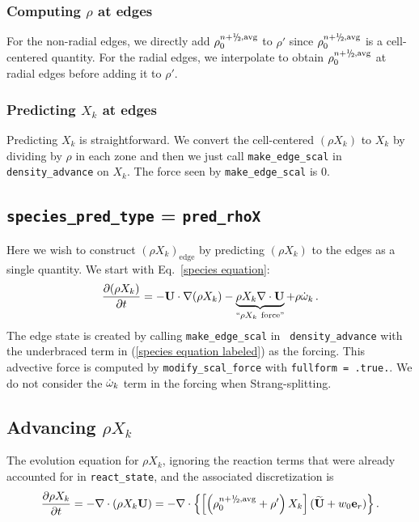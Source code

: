 \subsubsection{Computing $\rho$ at edges}\label{Computing rho at edges}
For the non-radial edges, we directly add $\rho_0^{n+\myhalf,{\rm avg}}$
to $\rho'$ since $\rho_0^{n+\myhalf,{\rm avg}}$ is a cell-centered
quantity.  For the radial edges, we interpolate to obtain
$\rho_0^{n+\myhalf,{\rm avg}}$ at radial edges before adding it to
$\rho'$.

\subsubsection{Predicting $X_k$ at edges}
Predicting $X_k$ is straightforward.  We convert the cell-centered
$(\rho X_k)$ to $X_k$ by dividing by $\rho$ in each zone and then we
just call {\tt make\_edge\_scal} in {\tt density\_advance} on $X_k$.
The force seen by {\tt make\_edge\_scal} is 0.


\subsection{{\tt species\_pred\_type} = {\tt pred\_rhoX}}

Here we wish to construct $(\rho X_k)_\mathrm{edge}$ by predicting
$(\rho X_k)$ to the edges as a single quantity.  We start with
Eq.~\ref{species equation}:
\begin{equation}
\frac{\partial(\rho X_k)}{\partial t} =
  -{\bf U}\cdot\nabla(\rho X_k) - \underbrace{\rho X_k \nabla\cdot{\bf U}}_{``\rho X_k ~\text{force''}} + \rho \dot{\omega}_k \, . \label{species equation labeled}
\end{equation}
The edge state is created by calling {\tt make\_edge\_scal} in {\tt
  density\_advance} with the underbraced term in (\ref{species
  equation labeled}) as the forcing.  This advective force is computed
by {\tt modify\_scal\_force} with {\tt fullform = .true.}.  We do not
consider the $\dot{\omega}_k$ term in the forcing when Strang-splitting.

\subsection{Advancing $\rho X_k$}\label{Advancing rhoX_k}
The evolution equation for $\rho X_k$, ignoring the reaction terms
that were already accounted for in {\tt react\_state}, and the
associated discretization is
\begin{equation}
\frac{\partial\rho X_k}{\partial t} = -\nabla\cdot(\rho X_k\Ub) = 
-\nabla\cdot\left\{\left[\left(\rho_0^{n+\myhalf,{\rm avg}} 
+ \rho'\right)X_k\right](\Ubt+w_0\eb_r)\right\}.
\end{equation}

